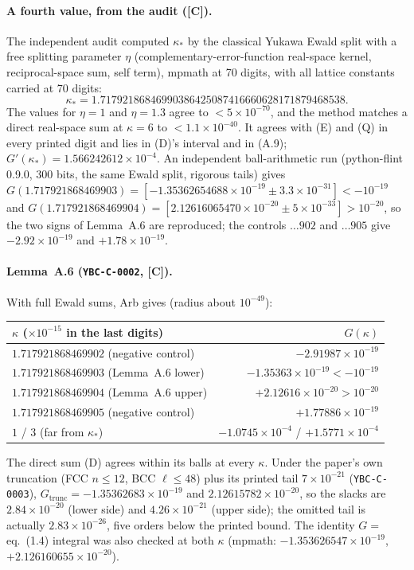 \documentclass[11pt]{article}
\newcommand{\tier}[1]{\textsf{[#1]}}
\newcommand{\tC}{\tier{C}}
\newcommand{\ks}{\kappa_*}
\begin{document}
\paragraph{A fourth value, from the audit (\tC).} The independent audit computed $\ks$ by the classical Yukawa Ewald split with a free splitting parameter $\eta$ (complementary-error-function real-space kernel, reciprocal-space sum, self term), mpmath at 70 digits, with all lattice constants carried at 70 digits:
\[\ks=1.71792186846990386425087416660628171879468538.\]
The values for $\eta=1$ and $\eta=1.3$ agree to $<5\times10^{-70}$, and the method matches a direct real-space sum at $\kappa=6$ to $<1.1\times10^{-40}$. It agrees with (E) and (Q) in every printed digit and lies in (D)'s interval and in (A.9); $G'(\ks)=1.566242612\times10^{-4}$.
An independent ball-arithmetic run (python-flint 0.9.0, 300 bits, the same Ewald split, rigorous tails) gives $G(1.717921868469903)=[-1.35362654688\times10^{-19}\pm3.3\times10^{-31}]<-10^{-19}$ and $G(1.717921868469904)=[2.12616065470\times10^{-20}\pm5\times10^{-33}]>10^{-20}$, so the two signs of Lemma~A.6 are reproduced; the controls $\ldots902$ and $\ldots905$ give $-2.92\times10^{-19}$ and $+1.78\times10^{-19}$.

\paragraph{Lemma~A.6 (\texttt{YBC-C-0002}, \tC).} With full Ewald sums, Arb gives (radius about $10^{-49}$):
\begin{center}\small\begin{tabular}{@{}lr@{}}\toprule
$\kappa$ ($\times10^{-15}$ in the last digits) & $G(\kappa)$\\\midrule
$1.717921868469902$ (negative control) & $-2.91987\times10^{-19}$\\
$1.717921868469903$ (Lemma~A.6 lower) & $-1.35363\times10^{-19}<-10^{-19}$\\
$1.717921868469904$ (Lemma~A.6 upper) & $+2.12616\times10^{-20}>10^{-20}$\\
$1.717921868469905$ (negative control) & $+1.77886\times10^{-19}$\\
$1$ / $3$ (far from $\ks$) & $-1.0745\times10^{-4}$ / $+1.5771\times10^{-4}$\\\bottomrule
\end{tabular}\end{center}
The direct sum (D) agrees within its balls at every $\kappa$. Under the paper's own truncation (FCC $n\le12$, BCC $\ell\le48$) plus its printed tail $7\times10^{-21}$ (\texttt{YBC-C-0003}), $G_{\mathrm{trunc}}=-1.35362683\times10^{-19}$ and
$2.12615782\times10^{-20}$, so the slacks are $2.84\times10^{-20}$ (lower side) and $4.26\times10^{-21}$ (upper side); the omitted tail is actually $2.83\times10^{-26}$, five orders below the printed bound. The identity $G=$ eq.~(1.4) integral was also checked at both $\kappa$ (mpmath: $-1.353626547\times10^{-19}$, $+2.126160655\times10^{-20}$).
\end{document}

